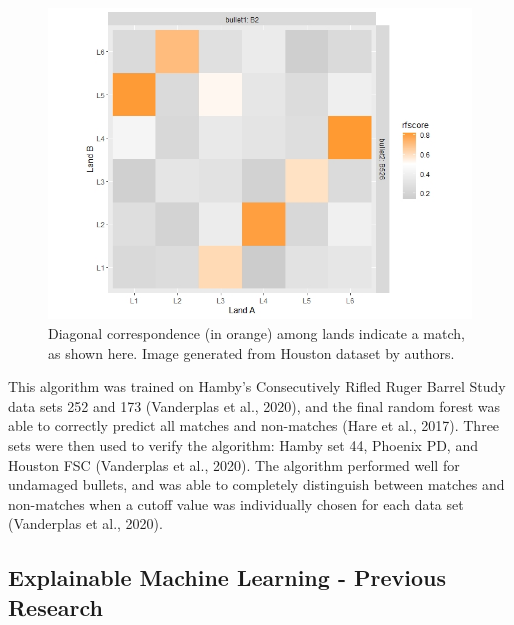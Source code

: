 \documentclass[print]{nuthesis}
\begin{document}
\begin{figure}
\includegraphics[width=\linewidth]{images/Test_Fire_F526} \caption{Diagonal correspondence (in orange) among lands indicate a match, as shown here. Image generated from Houston dataset by authors.}\label{fig:grid}
\end{figure}

This algorithm was trained on Hamby's Consecutively Rifled Ruger Barrel Study data sets 252 and 173 (Vanderplas et al., 2020), and the final random forest was able to correctly predict all matches and non-matches (Hare et al., 2017).
Three sets were then used to verify the algorithm: Hamby set 44, Phoenix PD, and Houston FSC (Vanderplas et al., 2020).
The algorithm performed well for undamaged bullets, and was able to completely distinguish between matches and non-matches when a cutoff value was individually chosen for each data set (Vanderplas et al., 2020).

\hypertarget{explainable-machine-learning---previous-research}{%
\subsection{Explainable Machine Learning - Previous Research}\label{explainable-machine-learning---previous-research}}
\end{document}
